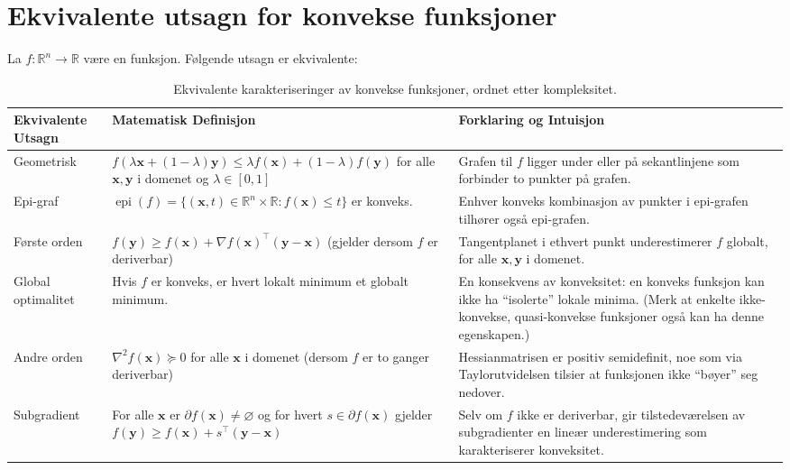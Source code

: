 \section{Ekvivalente utsagn for konvekse funksjoner}

La \(f:\mathbb{R}^n \to \mathbb{R}\) være en funksjon. Følgende utsagn er ekvivalente:
\begin{table}[H]
	\centering
	\small
	\setlength{\tabcolsep}{6pt}
	\begin{tabularx}{\textwidth}{|>{\raggedright\arraybackslash}X|>{\raggedright\arraybackslash}X|>{\raggedright\arraybackslash}X|}
		\rowcolor{rem-color!25}
		\textbf{Ekvivalente Utsagn} & \textbf{Matematisk Definisjon} & \textbf{Forklaring og Intuisjon} \\
		\hline
		Geometrisk & 
		\( f(\lambda \symbf{x} + (1-\lambda)\symbf{y}) \le \lambda f(\symbf{x}) + (1-\lambda)f(\symbf{y}) \)  
		for alle \( \symbf{x},\symbf{y} \) i domenet og \( \lambda \in [0,1] \)
		& Grafen til \( f \) ligger under eller på sekantlinjene som forbinder to punkter på grafen. \\
		\hline
		Epi-graf &
		\(\operatorname{epi}(f) = \{ (\symbf{x},t)\in\mathbb{R}^n\times\mathbb{R} : f(\symbf{x})\le t \}\) er konveks.
		& Enhver konveks kombinasjon av punkter i epi-grafen tilhører også epi-grafen. \\
		\hline
		Første orden &
		\( f(\symbf{y}) \ge f(\symbf{x}) + \nabla f(\symbf{x})^\top (\symbf{y}-\symbf{x}) \)
		(gjelder dersom \( f \) er deriverbar)
		& Tangentplanet i ethvert punkt underestimerer \( f \) globalt, for alle \( \symbf{x},\symbf{y} \) i domenet. \\
		\hline
		Global optimalitet &
		Hvis \( f \) er konveks, er hvert lokalt minimum et globalt minimum.
		& En konsekvens av konveksitet: en konveks funksjon kan ikke ha ``isolerte'' lokale minima. (Merk at enkelte ikke-konvekse, quasi-konvekse funksjoner også kan ha denne egenskapen.) \\\hline
		Andre orden &
		\( \nabla^2 f(\symbf{x}) \succeq 0 \) for alle \( \symbf{x} \) i domenet 
		(dersom \( f \) er to ganger deriverbar)
		& Hessianmatrisen er positiv semidefinit, noe som via Taylorutvidelsen tilsier at funksjonen ikke ``bøyer'' seg nedover. \\
		\hline
		Subgradient &
		For alle \( \symbf{x} \) er \( \partial f(\symbf{x}) \neq \varnothing \) og for hvert \( s \in \partial f(\symbf{x}) \) gjelder 
		\( f(\symbf{y}) \ge f(\symbf{x}) + s^\top (\symbf{y}-\symbf{x}) \)
		& Selv om \( f \) ikke er deriverbar, gir tilstedeværelsen av subgradienter en lineær underestimering som karakteriserer konveksitet. 
		\\
		\hline
	\end{tabularx}
	\caption{Ekvivalente karakteriseringer av konvekse funksjoner, ordnet etter kompleksitet.}
	\label{tab:convex_equivalence}
\end{table}

